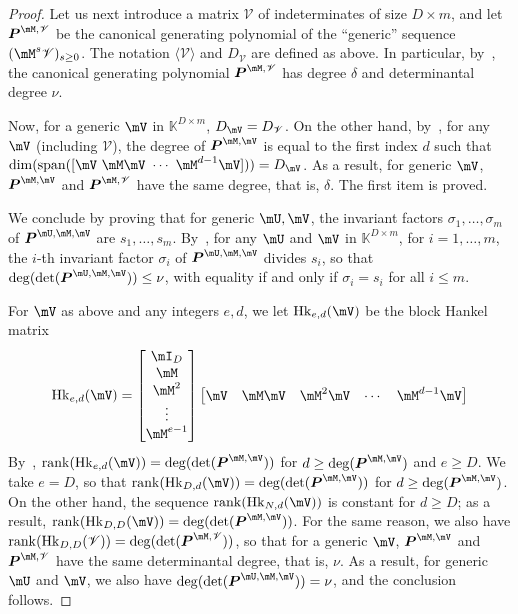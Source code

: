 \documentclass[12pt]{article}
\newcommand{\mat}[1]{\bm{\MakeUppercase{#1}}} %
\def\K{\mathbb{K}}
\def\K {\ensuremath{\mathbb{K}}}
\def\scrV {\ensuremath{\mathscr{V}}}
\begin{document}
\begin{proof}
  Let us next introduce a matrix $\scrV$ of indeterminates of size $D
  \times m$, and let $\mat{P}^{\mM,\scrV}$ be the canonical generating
  polynomial of the ``generic'' sequence $(\mM^s \scrV)_{s \ge
    0}$. The notation $\langle \scrV \rangle$ and $D_\scrV$ are
  defined as above.  In particular,
  by~\cite[Proposition~6.1]{Villard97a}, the canonical generating
  polynomial $\mat{P}^{\mM,\scrV}$ has degree $\delta$ and determinantal
  degree $\nu$.
  
  Now, for a generic $\mV$ in $\K^{D\times m}$, $D_\mV=D_\scrV$. On the
  other hand, by~\cite[Lemma~4.3]{Villard97a}, for any $\mV$
  (including $\scrV$), the degree of $\mat{P}^{\mM,\mV}$ is equal to
  the first index $d$ such that $\dim({\rm span}([\mV ~ \mM \mV ~
    \cdots ~\mM^{d-1} \mV]))=D_\mV$. As a result, for generic $\mV$,
  $\mat{P}^{\mM,\mV}$ and $\mat{P}^{\mM,\scrV}$ have the same degree,
  that is, $\delta$.  The first item is proved.
	
  We conclude by proving that for generic $\mU,\mV$, the invariant
  factors $\sigma_1,\dots,\sigma_m$ of $\mat{P}^{\mU,\mM,\mV}$ are
  $s_1,\dots,s_m$.  By~\cite[Theorem~2.12]{KaVi04}, for any $\mU$ and
  $\mV$ in $\K^{D\times m}$, for $i=1,\dots,m$, the $i$-th invariant
  factor $\sigma_i$ of $\mat{P}^{\mU,\mM,\mV}$ divides $s_i$, so that
  $\deg(\det(\mat{P}^{\mU,\mM,\mV}))\le\nu$, with equality if and only
  if $\sigma_i=s_i$ for all $i \le m$.
	
  For $\mV$ as above and any integers $e,d$, we let ${\rm
    Hk}_{e,d}(\mV)$ be the block Hankel matrix
  $$ {\rm Hk}_{e,d}(\mV) =
  \begin{bmatrix}
    \mI_D \\  \mM \\  \mM^2 \\ \vdots  \\  \mM^{e-1}
  \end{bmatrix}
  \begin{bmatrix}
    \mV & \mM\mV & \mM^2\mV &\cdots& \mM^{d-1}\mV
  \end{bmatrix}
  $$ By~\cite[Eq.~(2.6)]{KaVi04}, ${\rm rank}({\rm Hk}_{e,d}(\mV)) =
  \deg(\det(\mat{P}^{\mM,\mV}))$ for $d \ge \deg(\mat{P}^{\mM,\mV})$
  and $e \ge D$.  We take $e=D$, so that ${\rm rank}({\rm
    Hk}_{D,d}(\mV)) = \deg(\det(\mat{P}^{\mM,\mV}))$ for $d \ge
  \deg(\mat{P}^{\mM,\mV})$. On the other hand, the sequence ${\rm
    rank}({\rm Hk}_{N,d}(\mV))$ is constant for $d \ge D$; as a
  result, ${\rm rank}({\rm Hk}_{D,D}(\mV)) =
  \deg(\det(\mat{P}^{\mM,\mV}))$. For the same reason, we also have ${\rm
    rank}({\rm Hk}_{D,D}(\scrV)) = \deg(\det(\mat{P}^{\mM,\scrV}))$, so that
  for a generic $\mV$, $\mat{P}^{\mM,\mV}$ and $\mat{P}^{\mM,\scrV}$
  have the same determinantal degree, that is, $\nu$.  As a result,
  for generic $\mU$ and $\mV$, we also have
  $\deg(\det(\mat{P}^{\mU,\mM,\mV}))=\nu$, and the conclusion follows.
\end{proof} 
\end{document}
